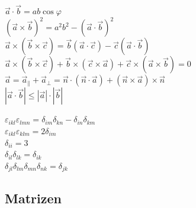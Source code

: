 \documentclass[12pt,a4paper, twoside]{article}
\newcommand{\abs}[1]{\left| #1 \right|}
\renewcommand{\=}[1]{\stackrel{#1}{=}}
\theoremstyle{definition}
\theoremstyle{remark}
\begin{document}
\begin{center}
\begin{minipage}[t]{.49\linewidth}
\vspace{0pt}
$\vec{a} \cdot \vec{b} = ab\cos\varphi$\\
$(\vec{a} \times \vec{b})^2 = a^2b^2 - (\vec{a} \cdot \vec{b})^2$\\
$\vec{a} \times (\vec{b} \times \vec{c}) = \vec{b}(\vec{a} \cdot \vec{c}) - \vec{c}(\vec{a} \cdot \vec{b})$\\
$\vec a \times (\vec b \times \vec c) + \vec b \times (\vec c \times \vec a) + \vec c \times (\vec a \times \vec b) = 0$\\
$\vec{a} = \vec{a}_{\parallel} + \vec{a}_{\perp} = \vec{n} \cdot (\vec{n} \cdot \vec{a}) + (\vec{n} \times \vec{a}) \times \vec{n}$\\
$\abs{\vec a \cdot \vec b} \leq \abs{\vec a} \cdot \abs{\vec b}$\\

\end{minipage}%
\begin{minipage}[t]{.49\linewidth}
\vspace{0pt}
$\varepsilon_{ikl} \varepsilon_{lmn} = \delta_{im} \delta_{kn} - \delta_{in} \delta_{km}$\\
$\varepsilon_{ikl} \varepsilon_{klm} = 2 \delta_{im}$\\
$\delta_{ii} = 3$\\
$\delta_{il} \delta_{lk} = \delta_{ik}$\\
$\delta_{jl}\delta_{lm}\delta_{mn}\delta_{nk} = \delta_{jk}$\\
\end{minipage}
\end{center}


\subsection{Matrizen}
\end{document}
